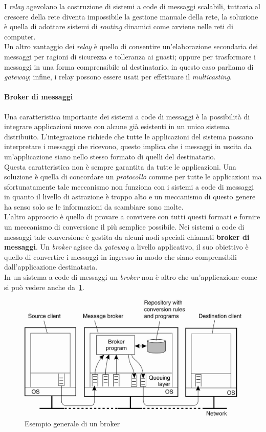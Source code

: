 I \emph{relay} agevolano la costruzione di sistemi a code di messaggi scalabili, tuttavia al crescere della rete diventa impossibile la gestione manuale della rete, la soluzione è quella di adottare sistemi di \emph{routing} dinamici come avviene nelle reti di computer.\\
Un altro vantaggio dei \emph{relay} è quello di consentire un'elaborazione secondaria dei messaggi per ragioni di sicurezza e tolleranza ai guasti; oppure per trasformare i messaggi in una forma comprensibile al destinatario, in questo caso parliamo di \emph{gateway}; infine, i relay possono essere usati per effettuare il \emph{multicasting}.
\paragraph{Broker di messaggi}
Una caratteristica importante dei sistemi a code di messaggi è  la possibilità di integrare applicazioni nuove con alcune già esistenti in un unico sistema distribuito. L'integrazione richiede che tutte le applicazioni del sistema possano interpretare i messaggi che ricevono, questo implica che i messaggi in uscita da un'applicazione siano nello stesso formato di quelli del destinatario.\\
Questa caratteristica non è sempre garantita da tutte le applicazioni. Una soluzione è quella di concordare un \emph{protocollo} comune per tutte le applicazioni ma sfortunatamente tale meccanismo non funziona con i sistemi a code di messaggi in quanto il livello di astrazione è troppo alto e un meccanismo di questo genere ha senso solo se le informazioni da scambiare sono molte.\\
L'altro approccio è quello di provare a convivere con tutti questi formati e fornire un meccanismo di conversione il più semplice possibile. Nei sistemi a code di messaggi tale conversione è gestita da alcuni nodi speciali chiamati \textbf{broker di messaggi}. Un \emph{broker} agisce da \emph{gateway} a livello applicativo, il suo obiettivo è quello di convertire i messaggi in ingresso in modo che siano comprensibili dall'applicazione destinataria.\\
In un sistema a code di messaggi un \emph{broker} non è altro che un'applicazione come si può vedere anche da \figurename\,\ref{img:broker}.\\
\begin{figure}
\centering
\includegraphics[scale=0.4]{img/broker.png}
\caption{Esempio generale di un broker}\label{img:broker}
\end{figure}
